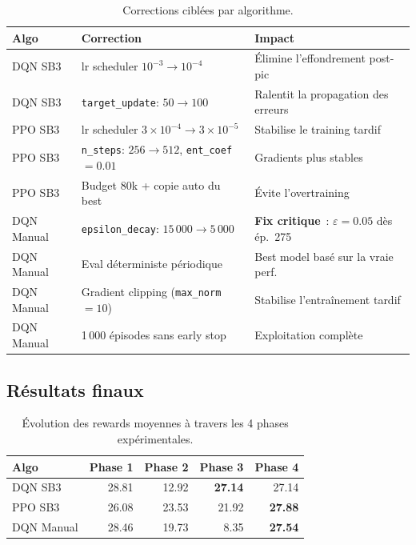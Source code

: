 \documentclass[11pt, a4paper]{article}
\begin{document}
\begin{table}[H]
\centering
\small
\begin{tabular}{llp{7cm}}
\toprule
\textbf{Algo} & \textbf{Correction} & \textbf{Impact}\\
\midrule
DQN SB3     & lr scheduler $10^{-3}\to 10^{-4}$ & Élimine l'effondrement post-pic\\
DQN SB3     & \texttt{target\_update}: $50\to 100$ & Ralentit la propagation des erreurs\\
\midrule
PPO SB3     & lr scheduler $3\!\times\!10^{-4}\to 3\!\times\!10^{-5}$ & Stabilise le training tardif\\
PPO SB3     & \texttt{n\_steps}: $256\to 512$, \texttt{ent\_coef}$=0.01$ & Gradients plus stables\\
PPO SB3     & Budget 80k + copie auto du best & Évite l'overtraining\\
\midrule
DQN Manual  & \texttt{epsilon\_decay}: $15\,000\to 5\,000$ & \textbf{Fix critique}~: $\varepsilon=0.05$ dès ép.~275\\
DQN Manual  & Eval déterministe périodique & Best model basé sur la vraie perf.\\
DQN Manual  & Gradient clipping (\texttt{max\_norm}$=10$) & Stabilise l'entraînement tardif\\
DQN Manual  & 1\,000 épisodes sans early stop & Exploitation complète\\
\bottomrule
\end{tabular}
\caption{Corrections ciblées par algorithme.}
\end{table}

\subsection{Résultats finaux}

\begin{table}[H]
\centering
\begin{tabular}{l rrrr}
\toprule
\textbf{Algo} & \textbf{Phase 1} & \textbf{Phase 2} & \textbf{Phase 3} & \textbf{Phase 4}\\
\midrule
DQN SB3     & 28.81 & 12.92 & \textbf{27.14} & 27.14\\
PPO SB3     & 26.08 & 23.53 & 21.92 & \textbf{27.88}\\
DQN Manual  & 28.46 & 19.73 & 8.35  & \textbf{27.54}\\
\bottomrule
\end{tabular}
\caption{Évolution des rewards moyennes à travers les 4 phases expérimentales.}
\label{tab:phases}
\end{table}
\end{document}
